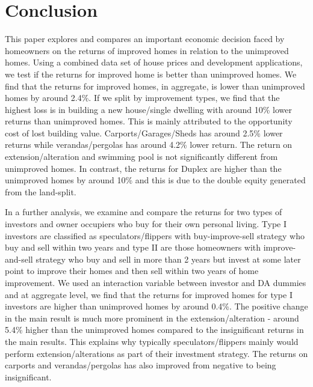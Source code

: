 \documentclass[AEJ,reqno, draftmode]{AEA} %
\begin{document}

\restoregeometry


\section{Conclusion}

This paper explores and compares an important economic decision faced by homeowners on the returns of improved homes in relation to the unimproved homes. Using a combined data set of house prices and development applications, we test if the returns for improved home is better than unimproved homes. We find that the returns for improved homes, in aggregate, is lower than unimproved homes by around 2.4\%. If we split by improvement types, we find that the highest loss is in building a new house/single dwelling with around 10\% lower returns than unimproved homes. This is mainly attributed to the opportunity cost of lost building value. Carports/Garages/Sheds has around 2.5\% lower returns while verandas/pergolas has around 4.2\% lower return. The return on extension/alteration and swimming pool is not significantly different from unimproved homes. In contrast, the returns for Duplex are higher than the unimproved homes by around 10\% and this is due to the double equity generated from the land-split.

In a further analysis, we examine and compare the returns for two types of investors and owner occupiers who buy for their own personal living. Type I investors are classified as speculators/flippers with buy-improve-sell strategy who buy and sell within two years and type II are those homeowners with improve-and-sell strategy who buy and sell in more than 2 years but invest at some later point to improve their homes and then sell within two years of home improvement. We used an interaction variable between investor and DA dummies and at aggregate level, we find that the returns for improved homes for type I investors are higher than unimproved homes by around 0.4\%. The positive change in the main result is much more prominent in the extension/alteration - around 5.4\% higher than the unimproved homes compared to the insignificant returns in the main results. This explains why typically speculators/flippers mainly would perform extension/alterations as part of their investment strategy. The returns on carports and verandas/pergolas has also improved from negative to being insignificant. 
\end{document}
